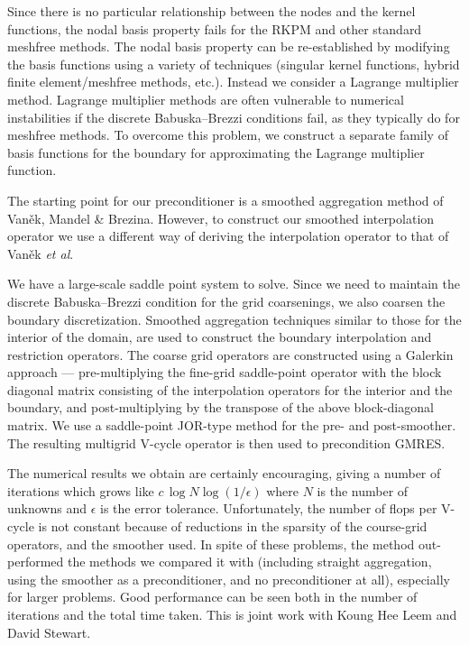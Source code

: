 \documentclass{report}
\begin{document}
Since there is no particular relationship between the nodes and the kernel
functions, the nodal basis property fails for the RKPM and other standard
meshfree methods. The nodal basis property can be re-established by
modifying the basis functions using a variety of techniques (singular kernel
functions, hybrid finite element/meshfree methods, etc.). Instead we
consider a Lagrange multiplier method. Lagrange multiplier methods are
often vulnerable to numerical instabilities if the discrete Babuska--Brezzi
conditions fail, as they typically do for meshfree methods. To overcome
this problem, we construct a separate family of basis functions for the
boundary for approximating the Lagrange multiplier function.

The starting point for our preconditioner is a smoothed aggregation
method of Van\v{e}k, Mandel \& Brezina. However, to construct our
smoothed interpolation operator we use a different way of deriving
the interpolation operator to that of Van\v{e}k \emph{et al}.

We have a large-scale saddle point system to solve. Since we need to
maintain the discrete Babuska--Brezzi condition for the grid coarsenings,
we also coarsen the boundary discretization. Smoothed aggregation
techniques similar to those for the interior of the domain, are used
to construct the boundary interpolation and restriction operators.
The coarse grid operators are constructed using a Galerkin approach ---
pre-multiplying the fine-grid saddle-point operator with the block
diagonal matrix consisting of the interpolation operators for
the interior and the boundary, and post-multiplying by the transpose of the
above block-diagonal matrix. We use a saddle-point JOR-type method
for the pre- and post-smoother. The resulting multigrid V-cycle operator
is then used to precondition GMRES.

The numerical results we obtain are certainly encouraging, giving a number
of iterations which grows like $c\,\log N\log(1/\epsilon)$ where $N$ is the
number of unknowns and $\epsilon$ is the error tolerance.
Unfortunately, the number of flops per V-cycle is not constant because
of reductions in the sparsity of the course-grid operators, and the smoother
used. In spite of these problems, the method out-performed the methods
we compared it with (including straight aggregation, using the
smoother as a preconditioner, and no preconditioner at all),
especially for larger problems. Good performance can be seen
both in the number of iterations and the total time taken.
This is joint work with Koung Hee Leem and David Stewart.
\end{document}
